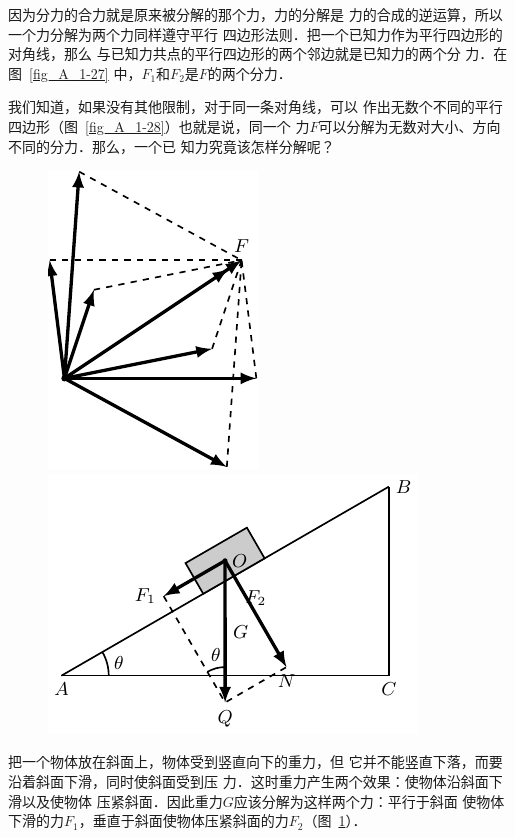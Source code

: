     因为分力的合力就是原来被分解的那个力，力的分解是
力的合成的逆运算，所以一个力分解为两个力同样遵守平行
四边形法则．把一个已知力作为平行四边形的对角线，那么
与已知力共点的平行四边形的两个邻边就是已知力的两个分
力．在图~\ref{fig_A_1-27} 中，$F_1$和$F_2$是$F$的两个分力．


    我们知道，如果没有其他限制，对于同一条对角线，可以
作出无数个不同的平行四边形（图~\ref{fig_A_1-28}）也就是说，同一个
力$F$可以分解为无数对大小、方向不同的分力．那么，一个已
知力究竟该怎样分解呢？

\begin{figure}[htbp]
	\centering
	\begin{minipage}[b]{0.46\textwidth} 
		\centering
		\includegraphics{fig/A/1-28.pdf} 
		\caption{} \label{fig_A_1-28} 
	\end{minipage} 
	\begin{minipage}[b]{0.5\textwidth} 
		\centering
		\includegraphics{fig/A/1-29.pdf} 
		\caption{} \label{fig_A_1-29} 
	\end{minipage} 
\end{figure} 


    把一个物体放在斜面上，物体受到竖直向下的重力，但
它并不能竖直下落，而要沿着斜面下滑，同时使斜面受到压
力．这时重力产生两个效果：使物体沿斜面下滑以及使物体
压紧斜面．因此重力$G$应该分解为这样两个力：平行于斜面
使物体下滑的力$F_1$，垂直于斜面使物体压紧斜面的力$F_2$（图~\ref{fig_A_1-29}）．



